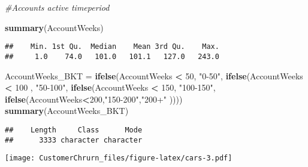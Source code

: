 \documentclass[]{article}
\newenvironment{Shaded}{\begin{snugshade}}{\end{snugshade}}
\newcommand{\KeywordTok}[1]{\textcolor[rgb]{0.13,0.29,0.53}{\textbf{#1}}}
\newcommand{\DataTypeTok}[1]{\textcolor[rgb]{0.13,0.29,0.53}{#1}}
\newcommand{\DecValTok}[1]{\textcolor[rgb]{0.00,0.00,0.81}{#1}}
\newcommand{\StringTok}[1]{\textcolor[rgb]{0.31,0.60,0.02}{#1}}
\newcommand{\CommentTok}[1]{\textcolor[rgb]{0.56,0.35,0.01}{\textit{#1}}}
\newcommand{\OperatorTok}[1]{\textcolor[rgb]{0.81,0.36,0.00}{\textbf{#1}}}
\newcommand{\NormalTok}[1]{#1}
\begin{document}
\begin{Shaded}
\begin{Highlighting}[]
\CommentTok{#Accounts active timeperiod}

\KeywordTok{summary}\NormalTok{(AccountWeeks)}
\end{Highlighting}
\end{Shaded}

\begin{verbatim}
##    Min. 1st Qu.  Median    Mean 3rd Qu.    Max. 
##     1.0    74.0   101.0   101.1   127.0   243.0
\end{verbatim}

\begin{Shaded}
\begin{Highlighting}[]
\NormalTok{AccountWeeks_BKT =}\StringTok{ }\KeywordTok{ifelse}\NormalTok{(AccountWeeks }\OperatorTok{<}\StringTok{ }\DecValTok{50}\NormalTok{, }\StringTok{"0-50"}\NormalTok{,}
                          \KeywordTok{ifelse}\NormalTok{(AccountWeeks }\OperatorTok{<}\StringTok{ }\DecValTok{100}\NormalTok{ , }\StringTok{"50-100"}\NormalTok{,}
                                 \KeywordTok{ifelse}\NormalTok{(AccountWeeks }\OperatorTok{<}\StringTok{ }\DecValTok{150}\NormalTok{, }\StringTok{"100-150"}\NormalTok{,}
                                        \KeywordTok{ifelse}\NormalTok{(AccountWeeks}\OperatorTok{<}\DecValTok{200}\NormalTok{,}\StringTok{"150-200"}\NormalTok{,}\StringTok{"200+"}
\NormalTok{                                               ))))}
\KeywordTok{summary}\NormalTok{(AccountWeeks_BKT)}
\end{Highlighting}
\end{Shaded}

\begin{verbatim}
##    Length     Class      Mode 
##      3333 character character
\end{verbatim}

\begin{Shaded}
\end{Shaded}

\texttt{[image: CustomerChrurn\_files/figure-latex/cars-3.pdf]}
\end{document}
